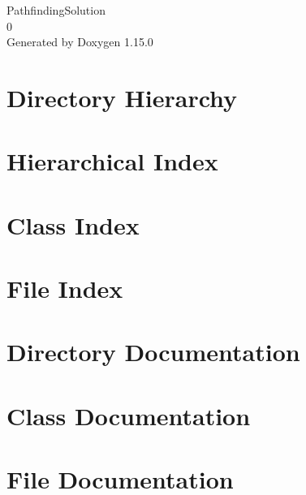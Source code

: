 \documentclass[twoside]{book}
\newcommand{\+}{\discretionary{\mbox{\scriptsize$\hookleftarrow$}}{}{}}
\newcommand{\clearemptydoublepage}{%
    \newpage{\pagestyle{empty}\cleardoublepage}%
  }
\begin{document}
  \raggedbottom
    \hypersetup{pageanchor=false,
                bookmarksnumbered=true,
                pdfencoding=unicode
               }
  \begin{titlepage}
  \vspace*{7cm}
  \begin{center}%
  {\Large Pathfinding\+Solution}\\
  [1ex]\large 0 \\
  \vspace*{1cm}
  {\large Generated by Doxygen 1.15.0}\\
  \end{center}
  \end{titlepage}
  \clearemptydoublepage
  \tableofcontents
  \clearemptydoublepage
  \hypersetup{pageanchor=true}
\chapter{Directory Hierarchy}

\chapter{Hierarchical Index}

\chapter{Class Index}

\chapter{File Index}

\chapter{Directory Documentation}





\chapter{Class Documentation}






\chapter{File Documentation}





  \backmatter
  \newpage
  \clearemptydoublepage
  \printindex
\end{document}
